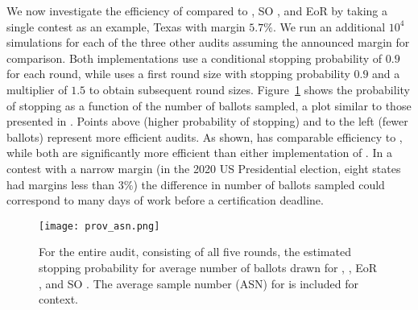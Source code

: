 We now investigate the efficiency of \Providence compared to \Minerva, SO \BRAVO, and EoR \BRAVO by taking a single contest as an example, Texas with margin $5.7\%$. We run an additional $10^4$ simulations for each of the three other audits assuming the announced margin for comparison. Both \BRAVO implementations use a conditional stopping probability of $0.9$ for each round, while \Minerva uses a first round size with stopping probability $0.9$ and a multiplier of $1.5$ to obtain subsequent round sizes. Figure~\ref{fig:prov-asn} shows the probability of stopping as a function of the number of ballots sampled, a plot similar to those presented in \cite{simulations}. Points above (higher probability of stopping) and to the left (fewer ballots) represent more efficient audits. As shown, \Providence has comparable efficiency to \Minerva, while both are significantly more efficient than either implementation of \BRAVO. In a contest with a narrow margin (in the 2020 US Presidential election, eight states had margins less than $3\%$) the difference in number of ballots sampled could correspond to many days of work before a certification deadline.

\begin{figure}
\texttt{[image: prov\_asn.png]}
\caption{For the entire audit, consisting of all five rounds, the estimated stopping probability for average number of ballots drawn for \Providence, \Minerva, EoR \BRAVO, and SO \BRAVO. The average sample number (ASN) for \B \BRAVO is included for context.}
\label{fig:prov-asn}
\end{figure}








